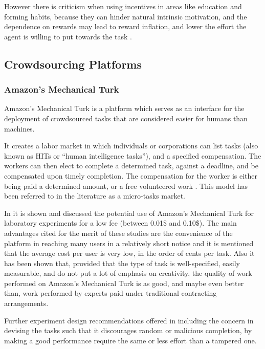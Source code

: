\documentclass[letterpaper]{article}
\begin{document}
However there is criticism when using incentives in areas like education and forming habits, because they can hinder natural intrinsic motivation, and the dependence on rewards may lead to reward inflation, and lower the effort the agent is willing to put towards the task \cite{Irlenbusch2005}. 





\subsection{Crowdsourcing Platforms}


\subsubsection{Amazon's Mechanical Turk}

Amazon's Mechanical Turk is a platform which serves as an interface for the deployment of crowdsourced tasks that are considered easier for humans than machines. 

It creates a labor market in which individuals or corporations can list tasks (also known as HITs or “human intelligence tasks”), and a specified compensation. The workers can then elect to complete a determined task, against a deadline, and be compensated upon timely completion. The compensation for the worker is either being paid a determined amount, or a free volunteered work \cite{Mason2010}. 
This model has been referred to in the literature as a micro-tasks market\cite{Kittur2008}.

In \cite{Mason2010} it is shown and discussed the potential use of Amazon's Mechanical Turk for laboratory experiments for a low fee (between 0.01\$ and 0.10\$).
The main advantages cited for the merit of these studies are the convenience of the platform in reaching many users in a relatively short notice and it is mentioned that the average cost per user is very low, in the order of cents per task.
Also it has been shown \cite{Kittur2008} that, provided that the type of task is well-specified, easily measurable, and do not put a lot of emphasis on creativity,  the quality of work performed on Amazon's Mechanical Turk is as good, and maybe even better than, work performed by experts paid under traditional contracting arrangements.

Further experiment design recommendations offered in \cite{Kittur2008} including the concern in devising the tasks such that it discourages random or malicious completion, by making a good performance require the same or less effort than a tampered one.
\end{document}
